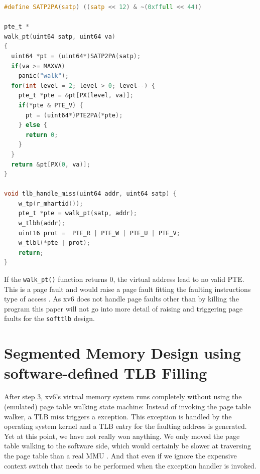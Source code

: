 \begin{lstlisting}[language=c,float=t,
    caption={\textbf{TLB miss exception Handler with Page Table Walk}
    The \texttt{walk\_pt()} function walks the Sv39 page table with the base address
    encoded in the \texttt{satp} register. If a PTE with the valid bit set is found, the function
    returns the address encoded in the PTE.
    Otherwise, the function returns \texttt{0}.},
    label={lst:softptw}]
#define SATP2PA(satp) ((satp << 12) & ~(0xffull << 44))

pte_t *
walk_pt(uint64 satp, uint64 va)
{
  uint64 *pt = (uint64*)SATP2PA(satp);
  if(va >= MAXVA)
    panic("walk");
  for(int level = 2; level > 0; level--) {
    pte_t *pte = &pt[PX(level, va)];
    if(*pte & PTE_V) {
      pt = (uint64*)PTE2PA(*pte);
    } else {
      return 0;
    }
  }
  return &pt[PX(0, va)];
}

void tlb_handle_miss(uint64 addr, uint64 satp) {
    w_tp(r_mhartid());
    pte_t *pte = walk_pt(satp, addr);
    w_tlbh(addr);
    uint16 prot =  PTE_R | PTE_W | PTE_U | PTE_V;
    w_tlbl(*pte | prot);
    return;
}
\end{lstlisting}


If the \texttt{walk\_pt()} function returns 0, the virtual address lead to no valid PTE. This is a
page fault and would raise a page fault fitting the faulting instructions type of access \cite{tanenbaumOS}.
As xv6 does not handle page faults other than by killing the program \cite{cox2011xv6} this
paper will not go into more detail of raising and triggering page faults for the \texttt{softtlb}
design.



\section{Segmented Memory Design using software-defined TLB Filling}

After step 3, xv6's virtual memory system runs completely without using the (emulated) page table
walking state machine:
Instead of invoking the page table walker, a TLB miss triggers a exception. This exception is handled by the
operating system kernel and a TLB entry for the faulting address is generated.
Yet at this point, we have not really won anything. We only moved the page table walking to the software side,
which would certainly be slower at traversing the page table than a real MMU \cite{jacob1998look}. And that
even if we ignore the expensive context switch that needs to be performed when the exception handler is invoked.

